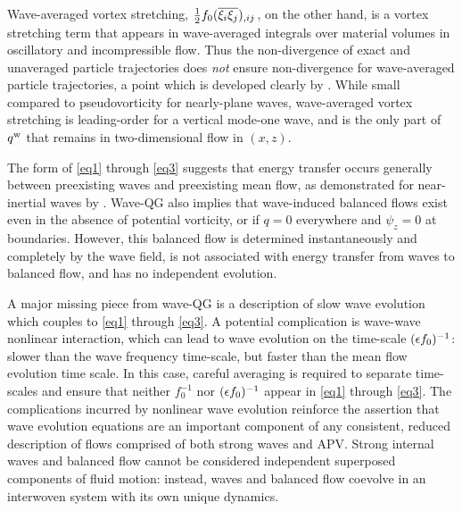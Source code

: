 \documentclass[12pt, oneside]{book}
\begin{document}
Wave-averaged vortex stretching, $\tfrac{1}{2} f_0 ( \overline{ \xi_i \xi_j } )_{,ij} \,$, on the other hand, is a vortex stretching term that appears in wave-averaged integrals over material volumes in oscillatory and incompressible flow.  Thus the non-divergence of exact and unaveraged particle trajectories does {\it not} ensure non-divergence for wave-averaged particle trajectories, a point which is developed clearly by \cite{McIntyre1988}.  While small compared to pseudovorticity for nearly-plane waves, wave-averaged vortex stretching is leading-order for a vertical mode-one wave, and is the only part of $q^{\mathrm{w}}$ that remains in two-dimensional flow in $(x,z)$.


The form of \eqref{eq1} through \eqref{eq3} suggests that energy transfer occurs generally between preexisting waves and preexisting mean flow, as demonstrated for near-inertial waves by \cite{XieVanneste}.  Wave-QG also implies that wave-induced balanced flows exist even in the absence of potential vorticity, or if $q=0$ everywhere and $\psi_z=0$ at boundaries.  However, this balanced flow is determined instantaneously and completely by the wave field, is not associated with energy transfer from waves to balanced flow, and has no independent evolution.

A major missing piece from wave-QG is a description of slow wave evolution which couples to \eqref{eq1} through \eqref{eq3}.  
A potential complication is wave-wave nonlinear interaction, which can lead to wave evolution on the time-scale $(\epsilon f_0)^{-1}$: slower than the wave frequency time-scale, but faster than the mean flow evolution time scale.  In this case, careful averaging is required to separate time-scales and ensure that neither $f_0^{-1}$ nor $(\epsilon f_0)^{-1}$ appear in \eqref{eq1} through \eqref{eq3}.  
The complications incurred by nonlinear wave evolution reinforce the assertion that wave evolution equations are an important component of any consistent, reduced description of flows comprised of both strong waves and APV.  Strong internal waves and balanced flow cannot be considered independent superposed components of fluid motion: instead, waves and balanced flow coevolve in an interwoven system with its own unique dynamics.
\end{document}

